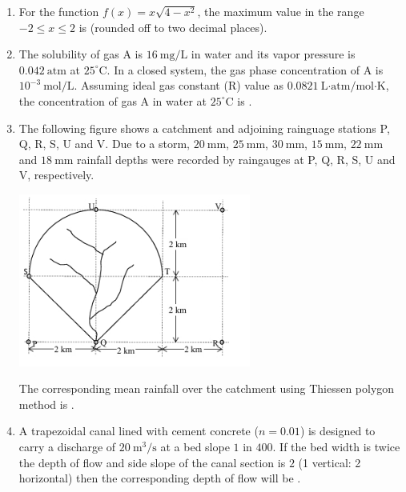 \documentclass[journal,12pt,onecolumn]{IEEEtran}
\theoremstyle{remark}
\begin{document}
\begin{enumerate}
\item For the function $f(x) = x\sqrt{4 - x^2}$, the maximum value in the range $-2 \leq x \leq 2$ is \underline{\hspace{2cm}} (rounded off to two decimal places). \hfill{}

\item The solubility of gas A is $16\ \text{mg/L}$ in water and its vapor pressure is $0.042\ \text{atm}$ at $25^\circ$C. In a closed system, the gas phase concentration of A is $10^{-3}\ \text{mol/L}$. Assuming ideal gas constant (R) value as $0.0821\ \text{L·atm/mol·K}$, the concentration of gas A in water at $25^\circ$C is \underline{\hspace{2cm}} . \hfill{}

\newpage

\item The following figure  shows a catchment  and adjoining rainguage stations P, Q, R, S, U and V. Due to a storm, $20\ \text{mm}$, $25\ \text{mm}$, $30\ \text{mm}$, $15\ \text{mm}$, $22\ \text{mm}$ and $18\ \text{mm}$ rainfall depths were recorded by raingauges at P, Q, R, S, U and V, respectively.

\begin{center}
\includegraphics[width=0.6\textwidth]{figs/img 4.jpeg}
\end{center}

The corresponding mean rainfall over the catchment using Thiessen polygon method is \underline{\hspace{2cm}} . \hfill{}

\item A trapezoidal canal lined with cement concrete ($n = 0.01$) is designed to carry a discharge of $20\ \text{m}^3/\text{s}$ at a bed slope $1$ in $400$. If the bed width is twice the depth of flow and side slope of the canal section is $2$ (1 vertical: 2 horizontal) then the corresponding depth of flow will be \underline{\hspace{2cm}} . \hfill{}


\end{enumerate}
\end{document}
